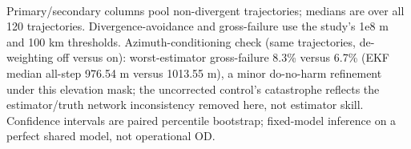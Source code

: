 \begin{table}[t]
{\begin{tabular}{lcccccc}
  \end{tabular}
  }
  \\[2pt] {\footnotesize Primary/secondary columns pool non-divergent trajectories; medians are over all 120 trajectories. Divergence-avoidance and gross-failure use the study's 1e8 m and 100 km thresholds. Azimuth-conditioning check (same trajectories, de-weighting off versus on): worst-estimator gross-failure 8.3\% versus 6.7\% (EKF median all-step 976.54 m versus 1013.55 m), a minor do-no-harm refinement under this elevation mask; the uncorrected control's catastrophe reflects the estimator/truth network inconsistency removed here, not estimator skill. Confidence intervals are paired percentile bootstrap; fixed-model inference on a perfect shared model, not operational OD.}
\end{table}